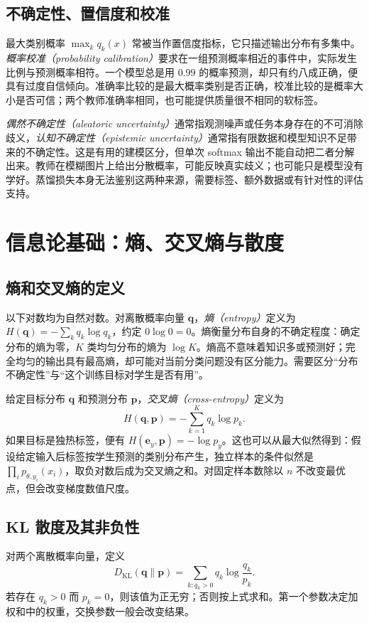 \documentclass[UTF8,12pt,a4paper,fontset=fandol]{ctexart}
\begin{document}
\subsection{不确定性、置信度和校准}
最大类别概率 $\max_kq_k(x)$ 常被当作置信度指标，它只描述输出分布有多集中。\emph{概率校准（probability calibration）}要求在一组预测概率相近的事件中，实际发生比例与预测概率相符。一个模型总是用 $0.99$ 的概率预测，却只有约八成正确，便具有过度自信倾向。准确率比较的是最大概率类别是否正确，校准比较的是概率大小是否可信；两个教师准确率相同，也可能提供质量很不相同的软标签。

\emph{偶然不确定性（aleatoric uncertainty）}通常指观测噪声或任务本身存在的不可消除歧义，\emph{认知不确定性（epistemic uncertainty）}通常指有限数据和模型知识不足带来的不确定性。这是有用的建模区分，但单次 softmax 输出不能自动把二者分解出来。教师在模糊图片上给出分散概率，可能反映真实歧义；也可能只是模型没有学好。蒸馏损失本身无法鉴别这两种来源，需要标签、额外数据或有针对性的评估支持。

\section{信息论基础：熵、交叉熵与散度}
\label{sec:kd-information}

\subsection{熵和交叉熵的定义}
以下对数均为自然对数。对离散概率向量 $\mathbf q$，\emph{熵（entropy）}定义为 $H(\mathbf q)=-\sum_kq_k\log q_k$，约定 $0\log0=0$。熵衡量分布自身的不确定程度：确定分布的熵为零，$K$ 类均匀分布的熵为 $\log K$。熵高不意味着知识多或预测好；完全均匀的输出具有最高熵，却可能对当前分类问题没有区分能力。需要区分“分布不确定性”与“这个训练目标对学生是否有用”。

给定目标分布 $\mathbf q$ 和预测分布 $\mathbf p$，\emph{交叉熵（cross-entropy）}定义为
\begin{equation}
 H(\mathbf q,\mathbf p)=-\sum_{k=1}^Kq_k\log p_k.
 \label{eq:kd-crossentropy}
\end{equation}
如果目标是独热标签，便有 $H(\mathbf e_y,\mathbf p)=-\log p_y$。这也可以从最大似然得到：假设给定输入后标签按学生预测的类别分布产生，独立样本的条件似然是 $\prod_i p_{\theta,y_i}(x_i)$，取负对数后成为交叉熵之和。对固定样本数除以 $n$ 不改变最优点，但会改变梯度数值尺度。

\subsection{KL 散度及其非负性}
\begin{definition}
对两个离散概率向量，定义
\begin{equation}
 D_{\mathrm{KL}}(\mathbf q\|\mathbf p)
 =\sum_{k:q_k>0}q_k\log\frac{q_k}{p_k}.
 \label{eq:kd-kl}
\end{equation}
若存在 $q_k>0$ 而 $p_k=0$，则该值为正无穷；否则按上式求和。第一个参数决定加权和中的权重，交换参数一般会改变结果。
\end{definition}
\end{document}
